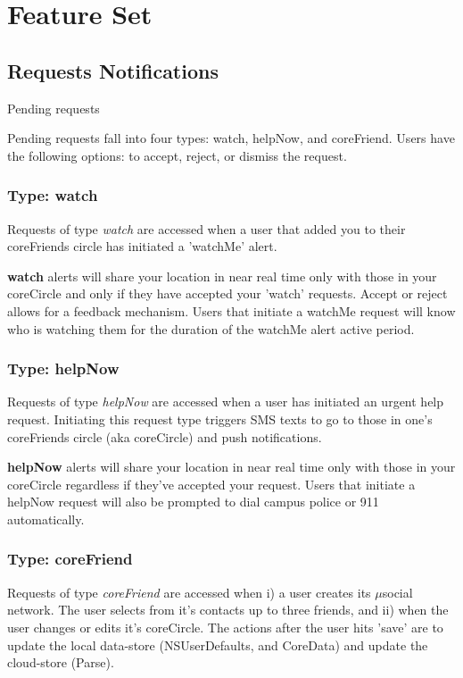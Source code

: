 \section{Feature Set}

\subsection{Requests Notifications}
  
  Pending requests 
  
  Pending requests fall into four types: watch, helpNow, and coreFriend.
  Users have the following options: to accept, reject, or dismiss the request.
    
\subsubsection{Type: watch}
  Requests of type \emph{watch} are accessed when a user that added you to their 
  coreFriends circle has initiated a 'watchMe' alert.
  
  \textbf{watch} alerts will share your location in near real time only with those
  in your coreCircle and only if they have accepted your 'watch' requests.  Accept or 
  reject allows for a feedback mechanism.  Users that initiate a watchMe request will
  know who is watching them for the duration of the watchMe alert active period.
  
\subsubsection{Type: helpNow}
  Requests of type \emph{helpNow} are accessed when a user has initiated an urgent help
  request.  Initiating this request type triggers SMS texts to go to those in
  one's coreFriends circle (aka coreCircle) and push notifications.
  
  \textbf{helpNow} alerts will share your location in near real time only with those
  in your coreCircle regardless if they've accepted your request.  Users that initiate 
  a helpNow request will also be prompted to dial campus police or 911 automatically.
   
\subsubsection{Type: coreFriend }
  Requests of type \emph{coreFriend} are accessed when i) a user creates its $\mu$social
  network.  The user selects from it's contacts up to three friends, and ii) when the user
  changes or edits it's coreCircle.  The actions after the user hits 'save' are to update
  the local data-store (NSUserDefaults, and CoreData) and update the cloud-store (Parse).
  
